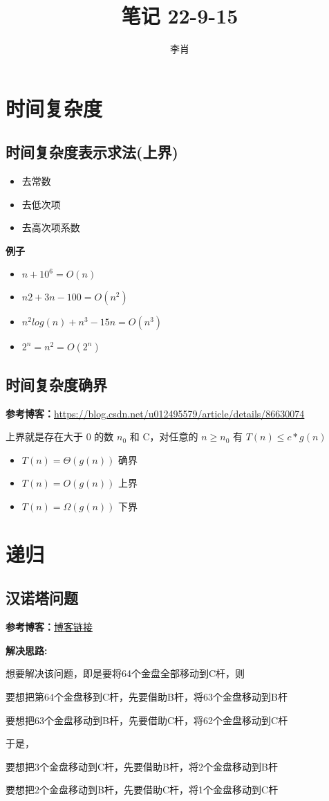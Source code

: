 \documentclass[UTF8]{ctexart}
\title{笔记 22-9-15}
\author{李肖}
\begin{document}
\maketitle

\section{时间复杂度}

\subsection{时间复杂度表示求法(上界)}
\begin{itemize}
    \item 去常数
    \item 去低次项
    \item 去高次项系数
\end{itemize}

\textbf{例子}

\begin{itemize}
    \item $n + 10^6 = O(n)$
    \item $n2 + 3n - 100 = O(n^2)$
    \item $n^2log(n) + n^3 - 15n = O(n^3)$
    \item $2^n = n ^ 2 = O(2^n)$
\end{itemize}

\subsection{时间复杂度确界}

\textbf{参考博客：}\href{https://blog.csdn.net/u012495579/article/details/86630074}{https://blog.csdn.net/u012495579/article/details/86630074}

上界就是存在大于 0 的数 $n_0$ 和 C，对任意的 $ n \geq n_0$ 有 $T(n) \leq c*g(n)$

\begin{itemize}
    \item $T(n) = \Theta(g(n))$ 确界
    \item $T(n) = O(g(n))$ 上界
    \item $T(n) = \Omega(g(n))$ 下界
\end{itemize}

\section{递归}

\subsection{汉诺塔问题}

\textbf{参考博客：}\href{https://blog.csdn.net/weixin_66030644/article/details/124276464}{博客链接}

\textbf{解决思路:}

想要解决该问题，即是要将64个金盘全部移动到C杆，则

要想把第64个金盘移到C杆，先要借助B杆，将63个金盘移动到B杆

要想把63个金盘移动到B杆，先要借助C杆，将62个金盘移动到C杆

于是，

要想把3个金盘移动到C杆，先要借助B杆，将2个金盘移动到B杆

要想把2个金盘移动到B杆，先要借助C杆，将1个金盘移动到C杆
\end{document}
